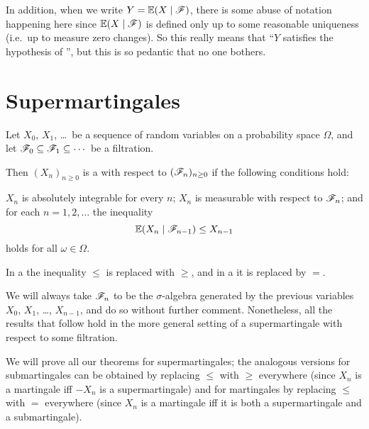 \begin{abuse}
	In addition, when we write $Y = \mathbb E(X \mid \mathscr F)$,
	there is some abuse of notation happening here
	since $\mathbb E(X \mid \mathscr F)$ is defined only up to some reasonable uniqueness
	(i.e.\ up to measure zero changes).
	So this really means that
	``$Y$ satisfies the hypothesis of '',
	but this is so pedantic that no one bothers.
\end{abuse}


\section{Supermartingales}

\begin{definition}
	Let $X_0$, $X_1$, \dots\ be a sequence of random variables
	on a probability space $\Omega$,
	and let $\mathscr F_0 \subseteq \mathscr F_1 \subseteq \cdots$ be a filtration.

	Then $(X_n)_{n \ge 0}$ is a 
	with respect to $(\mathscr F_n)_{n \ge 0}$ if the following conditions hold:
	\begin{itemize}
		\ii $X_n$ is absolutely integrable for every $n$;
		\ii $X_n$ is measurable with respect to $\mathscr F_n$; and
		\ii for each $n = 1, 2, \dots$ the inequality
		\[ \mathbb E(X_n \mid \mathscr F_{n-1}) \le X_{n-1} \]
		holds for all $\omega \in \Omega$.
	\end{itemize}

	In a  the inequality $\le$ is replaced with $\ge$,
	and in a  it is replaced by $=$.
\end{definition}

\begin{abuse}
	We will always take $\mathscr F_n$ to be the $\sigma$-algebra
	generated by the previous variables $X_0$, $X_1$, \dots, $X_{n-1}$,
	and do so without further comment.
	Nonetheless, all the results that follow hold in the more general setting
	of a supermartingale with respect to some filtration.
\end{abuse}

We will prove all our theorems for supermartingales;
the analogous versions for submartingales can be obtained
by replacing $\le$ with $\ge$ everywhere
(since $X_n$ is a martingale iff $-X_n$ is a supermartingale)
and for martingales by replacing $\le$ with $=$ everywhere
(since $X_n$ is a martingale iff it is both a supermartingale
and a submartingale).

